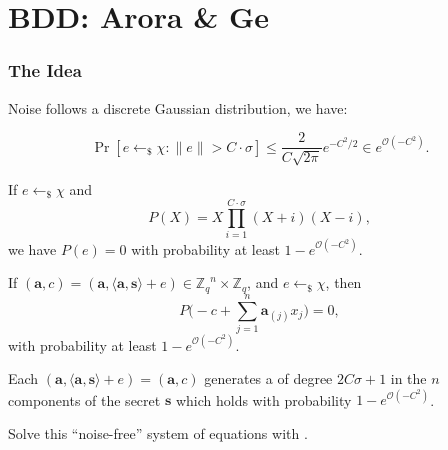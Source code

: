 \documentclass[10pt]{beamer}
\newcommand{\abs}[1]{\ensuremath{\|#1\|}\xspace}
\renewcommand{\vec}[1]{\mathbf{#1}\xspace}
\newcommand{\cemph}[1]{{\color{yellow9}{\bf #1}}\xspace}
\newcommand{\Z}{\ensuremath{\mathbb{Z}}\xspace}
\newcommand{\Zq}{\ensuremath{\Z_q}\xspace}
\newcommand{\sample}{\ensuremath{\leftarrow_{\$}}}
\newcommand{\bigO}[1]{\ensuremath{\mathcal{O}\left(#1\right)}\xspace}
\begin{document}
\section{BDD: Arora \& Ge}

\begin{frame}[allowframebreaks]
\frametitle{The Idea}

Noise follows a discrete Gaussian distribution, we have:

$$
\Pr [e \sample \chi : \abs{e} >C \cdot \sigma ]  \leq  \frac{2}{C \sqrt{2 \pi}}e^{-C^2/2} \in e^{\bigO{-C^2}}.
$$

\vspace{1em}

\hspace{-15em}

\framebreak

If $e \sample \chi$ and
$$
P(X)=X \prod_{i=1}^{C \cdot \sigma}(X+i)(X-i),
$$
we have $P(e) = 0$  with probability at least $1- e^{\bigO{-C^2}}$.

\vspace{1em}

If $(\vec{a},c)  = (\vec{a},\langle\vec{a},\vec{s}\rangle+e) \in \Zq^n \times \Zq$, and $e \sample \chi$, then
$$P\big(-c + \sum_{j=1}^{n} \mathbf{a}_{(j)}x_j\big)=0,$$
with probability at least $1-e^{\bigO{-C^2}}$. 

\framebreak

Each $(\vec{a},\langle\vec{a},\vec{s}\rangle + e)=(\vec{a},c)$ generates a \cemph{non-linear equation} of degree $2C\sigma+1$ in the $n$ components of the secret $\vec{s}$ which holds with probability $1-e^{\bigO{-C^2}}$.

\vspace{1em}

Solve this ``noise-free'' system of equations with \cemph{Gröbner bases}.

\end{frame}
\end{document}
